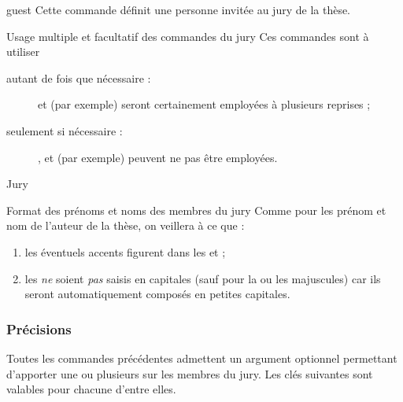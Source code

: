 \begin{docCommand}{guest}{}
  Cette commande définit une personne invitée au jury de la thèse.
\end{docCommand}
%
\begin{dbwarning}{Usage multiple et facultatif des commandes du
    jury}{}
  Ces commandes sont à utiliser
  \begin{description}
  \item[autant de fois que nécessaire :]
     et  (par exemple) seront
    certainement employées à plusieurs reprises ;
  \item[seulement si nécessaire :]
    ,  et  (par
    exemple) peuvent ne pas être employées.
  \end{description}
\end{dbwarning}

\begin{dbexample}{Jury}{}
\begin{bodycode}
%
%
\end{bodycode}
\end{dbexample}

\begin{dbwarning}{Format des prénoms et noms des membres du jury}{}
  Comme pour les prénom et nom de l'auteur de la thèse, on veillera à ce que :
  \begin{enumerate}
  \item les éventuels accents figurent dans les  et ;
  \item les  \emph{ne} soient \emph{pas} saisis en capitales (sauf
    pour la ou les majuscules) car ils seront automatiquement composés en
    petites capitales.
  \end{enumerate}
\end{dbwarning}

\subsubsection{Précisions}\label{sec:options-staff}

Toutes les commandes précédentes admettent un argument optionnel
permettant d'apporter une ou plusieurs  sur les
membres du jury. Les clés suivantes sont valables pour chacune
d'entre elles.

